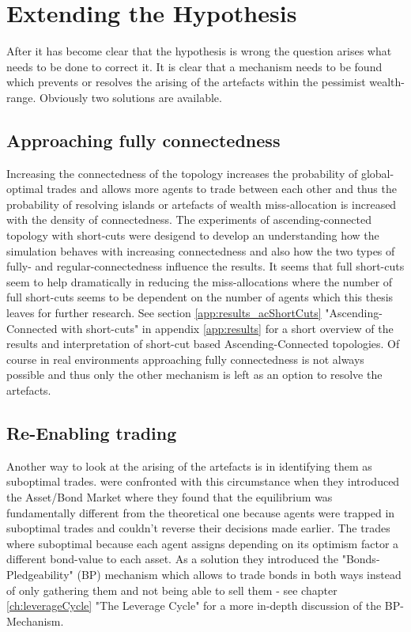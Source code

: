\documentclass[Bachelorarbeit.tex]{subfiles}
\begin{document}
\section{Extending the Hypothesis}
After it has become clear that the hypothesis is wrong the question arises what needs to be done to correct it. It is clear that a mechanism needs to be found which prevents or resolves the arising of the artefacts within the pessimist wealth-range. Obviously two solutions are available.

\subsection{Approaching fully connectedness}
Increasing the connectedness of the topology increases the probability of global-optimal trades and allows more agents to trade between each other and thus the probability of resolving islands or artefacts of wealth miss-allocation is increased with the density of connectedness.
The experiments of ascending-connected topology with short-cuts were desigend to develop an understanding how the simulation behaves with increasing connectedness and also how the two types of  fully- and regular-connectedness influence the results.
It seems that full short-cuts seem to help dramatically in reducing the miss-allocations where the number of full short-cuts seems to be dependent on the number of agents which this thesis leaves for further research. See section \ref{app:results_acShortCuts} "Ascending-Connected with short-cuts" in appendix \ref{app:results} for a short overview of the results and interpretation of short-cut based Ascending-Connected topologies.
\linebreak
Of course in real environments approaching fully connectedness is not always possible and thus only the other mechanism is left as an option to resolve the artefacts.

\subsection{Re-Enabling trading}
\label{ch:interpretation_reenablingTrading}
Another way to look at the arising of the artefacts is in identifying them as suboptimal trades. \cite{Breuer2015} were confronted with this circumstance when they introduced the Asset/Bond Market where they found that the equilibrium was fundamentally different from the theoretical one because agents were trapped in suboptimal trades and couldn't reverse their decisions made earlier. The trades where suboptimal because each agent assigns depending on its optimism factor a different bond-value to each asset. As a solution they introduced the "Bonds-Pledgeability" (BP) mechanism which allows to trade bonds in both ways instead of only gathering them and not being able to sell them - see chapter \ref{ch:leverageCycle} "The Leverage Cycle" for a more in-depth discussion of the BP-Mechanism.
\end{document}
